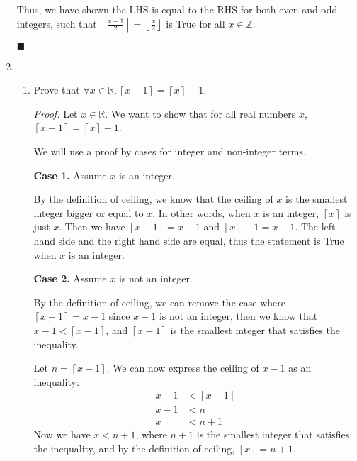 \documentclass{article}
\newcommand\qedsymbol{\hfill$\blacksquare$}
\begin{document}
\begin{enumerate}[label=(\alph*)]
        Thus, we have shown the LHS is equal to the RHS for both 
        even and odd integers, such that $
        \left\lceil \frac{x-1}{2} \right\rceil  = 
        \left\lfloor \frac{x}{2} \right\rfloor$ is True for all $x \in \mathbb{Z}$.

        \qedsymbol
    \newpage
    \item \begin{enumerate}[label=(\roman*)]
        \item Prove that $\forall x \in \mathbb{R}, \left\lceil 
            x - 1 \right\rceil  = \left\lceil x \right\rceil - 1$.
        
            \textit{Proof.} Let $x \in \mathbb{R}$.
            We want to show that for all real numbers $x$, 
            $\left\lceil x -1\right\rceil = 
            \left\lceil x \right\rceil - 1$. 

            We will use a proof by cases for integer and non-integer terms.

            \textbf{Case 1.} Assume $x$ is an integer.

            By the definition of ceiling, we know that the ceiling of 
            $x$ is the smallest integer bigger or equal to $x$. In other 
            words, when $x$ is an integer, $\left\lceil x \right\rceil $ 
            is just $x$. Then we have $\left\lceil x - 1 \right\rceil 
            = x - 1$ and $\left\lceil x \right\rceil - 1 = x - 1  $. 
            The left hand side and the right hand side are equal, thus 
            the statement is True when $x$ is an integer. 

            \textbf{Case 2.} Assume $x$ is not an integer.

            By the definition of ceiling, we can remove the case 
            where $\left\lceil x - 1 \right\rceil = x - 1$ since $x - 1$ is not
            an integer, then we know that $x - 1 < \left\lceil x - 1 \right\rceil $, and 
            $\left\lceil x - 1\right\rceil $ is the smallest integer that satisfies 
            the inequality. 

           Let $n = \left\lceil x - 1\right\rceil $.  
            We can now express the ceiling of $x - 1$ as an 
            inequality:
            \begin{align*}
                x -1 &< \left\lceil x -1 \right\rceil\\ 
                x - 1 &< n   \\
                x &< n + 1
            \end{align*}
            Now we have $x < n + 1$, where $n + 1$ is the smallest integer 
            that satisfies the inequality, and by the definition of ceiling, $\left\lceil 
            x\right\rceil = n + 1 $. 
            

\end{enumerate}
\end{enumerate}
\end{document}
